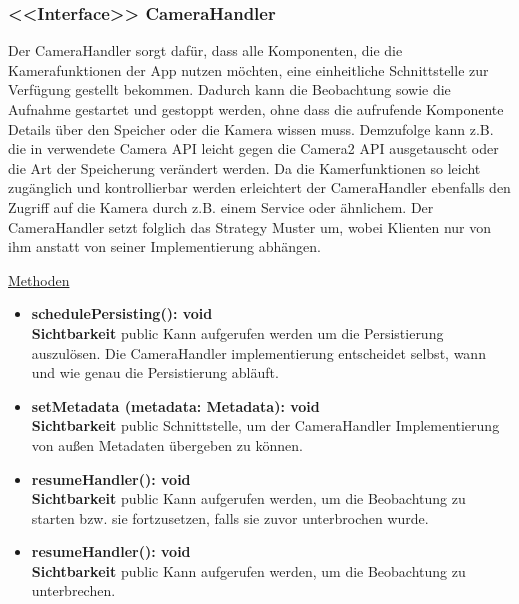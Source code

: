 \subsubsection{<<Interface>> CameraHandler} \label{app:klasse:CameraHandler}
Der CameraHandler sorgt dafür, dass alle Komponenten, die die Kamerafunktionen der App nutzen möchten, eine einheitliche Schnittstelle zur Verfügung gestellt bekommen. Dadurch kann die Beobachtung sowie die Aufnahme gestartet und gestoppt werden, ohne dass die aufrufende Komponente Details über den Speicher oder die Kamera wissen muss. Demzufolge kann z.B. die in  verwendete Camera API leicht gegen die Camera2 API ausgetauscht oder die Art der Speicherung verändert werden. Da die Kamerfunktionen so leicht zugänglich und kontrollierbar werden erleichtert der CameraHandler ebenfalls den Zugriff auf die Kamera durch z.B. einem Service oder ähnlichem. Der CameraHandler setzt folglich das Strategy Muster um, wobei Klienten nur von ihm anstatt von seiner Implementierung abhängen.
\newline

\underline{Methoden}
\begin{itemize}
\itemsep0pt

\item \textbf{schedulePersisting(): void}\hfill\\
\textbf{Sichtbarkeit} public\newline
Kann aufgerufen werden um die Persistierung auszulösen. Die CameraHandler implementierung entscheidet selbst, wann und wie genau die Persistierung abläuft.

\item \textbf{setMetadata (metadata: Metadata): void}\hfill\\
\textbf{Sichtbarkeit} public\newline
Schnittstelle, um der CameraHandler Implementierung von außen Metadaten übergeben zu können.

\item \textbf{resumeHandler(): void}\hfill\\
\textbf{Sichtbarkeit} public\newline
Kann aufgerufen werden, um die Beobachtung zu starten bzw. sie fortzusetzen, falls sie zuvor unterbrochen wurde.

\item \textbf{resumeHandler(): void}\hfill\\
\textbf{Sichtbarkeit} public\newline
Kann aufgerufen werden, um die Beobachtung zu unterbrechen.

\end{itemize}